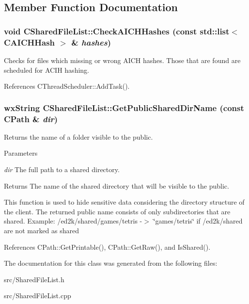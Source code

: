 \subsection{Member Function Documentation}
\subsubsection[{CheckAICHHashes}]{\setlength{\rightskip}{0pt plus 5cm}void CSharedFileList::CheckAICHHashes (const std::list$<$ {\bf CAICHHash} $>$ \& {\em hashes})}\label{classCSharedFileList_acc7ccf533d2faf87d354992d0aa41a7a}


Checks for files which missing or wrong AICH hashes. Those that are found are scheduled for ACIH hashing. 

References CThreadScheduler::AddTask().
\subsubsection[{GetPublicSharedDirName}]{\setlength{\rightskip}{0pt plus 5cm}wxString CSharedFileList::GetPublicSharedDirName (const {\bf CPath} \& {\em dir})}\label{classCSharedFileList_acc3321816e362004753835dcdf906ab7}


Returns the name of a folder visible to the public. 
\begin{DoxyParams}{Parameters}
\item[{\em dir}]The full path to a shared directory. \end{DoxyParams}
\begin{DoxyReturn}{Returns}
The name of the shared directory that will be visible to the public.
\end{DoxyReturn}
This function is used to hide sensitive data considering the directory structure of the client. The returned public name consists of only subdirectories that are shared. Example: /ed2k/shared/games/tetris -\/$>$ \char`\"{}games/tetris\char`\"{} if /ed2k/shared are not marked as shared 

References CPath::GetPrintable(), CPath::GetRaw(), and IsShared().

The documentation for this class was generated from the following files:\begin{DoxyCompactItemize}
\item 
src/SharedFileList.h\item 
src/SharedFileList.cpp\end{DoxyCompactItemize}
